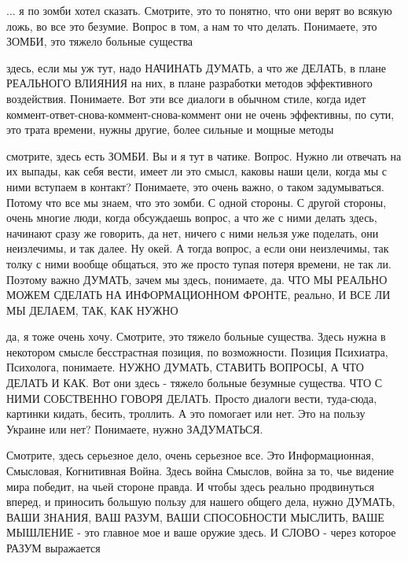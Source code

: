  
 
 
 
 

... я по зомби хотел сказать. Смотрите, это то понятно, что они верят во всякую
ложь, во все это безумие. Вопрос в том, а нам то что делать. Понимаете, это
ЗОМБИ, это тяжело больные существа

здесь, если мы уж тут, надо НАЧИНАТЬ ДУМАТЬ, а что же ДЕЛАТЬ, в плане РЕАЛЬНОГО
ВЛИЯНИЯ на них, в плане разработки методов эффективного воздействия. Понимаете.
Вот эти все диалоги в обычном стиле, когда идет
коммент-ответ-снова-коммент-снова-коммент они не очень эффективны, по сути, это
трата времени, нужны другие, более сильные и мощные методы

смотрите, здесь есть ЗОМБИ. Вы и я тут в чатике. Вопрос. Нужно ли отвечать на
их выпады, как себя вести, имеет ли это смысл, каковы наши цели, когда мы с
ними вступаем в контакт? Понимаете, это очень важно, о таком задумываться.
Потому что все мы знаем, что это зомби. С одной стороны. С другой стороны,
очень многие люди, когда обсуждаешь вопрос, а что же с ними делать здесь,
начинают сразу же говорить, да нет, ничего с ними нельзя уже поделать, они
неизлечимы, и так далее. Ну окей. А тогда вопрос, а если они неизлечимы, так
толку с ними вообще общаться, это же просто тупая потеря времени, не так ли.
Поэтому важно ДУМАТЬ, зачем мы здесь, понимаете, да. ЧТО МЫ РЕАЛЬНО МОЖЕМ
СДЕЛАТЬ НА ИНФОРМАЦИОННОМ ФРОНТЕ, реально, И ВСЕ ЛИ МЫ ДЕЛАЕМ, ТАК, КАК НУЖНО

да, я тоже очень хочу. Смотрите, это тяжело больные существа. Здесь нужна в
некотором смысле бесстрастная позиция, по возможности. Позиция Психиатра,
Психолога, понимаете. НУЖНО ДУМАТЬ, СТАВИТЬ ВОПРОСЫ, А ЧТО ДЕЛАТЬ И КАК. Вот
они здесь - тяжело больные безумные существа. ЧТО С НИМИ СОБСТВЕННО ГОВОРЯ
ДЕЛАТЬ. Просто диалоги вести, туда-сюда, картинки кидать, бесить, троллить. А
это помогает или нет. Это на пользу Украине или нет? Понимаете, нужно
ЗАДУМАТЬСЯ.

Смотрите, здесь серьезное дело, очень серьезное все. Это Информационная,
Смысловая, Когнитивная Война. Здесь война Смыслов, война за то, чье видение
мира победит, на чьей стороне правда. И чтобы здесь реально продвинуться
вперед, и приносить большую пользу для нашего общего дела, нужно ДУМАТЬ, ВАШИ
ЗНАНИЯ, ВАШ РАЗУМ, ВАШИ СПОСОБНОСТИ МЫСЛИТЬ, ВАШЕ МЫШЛЕНИЕ - это главное мое и
ваше оружие здесь. И СЛОВО - через которое РАЗУМ выражается

